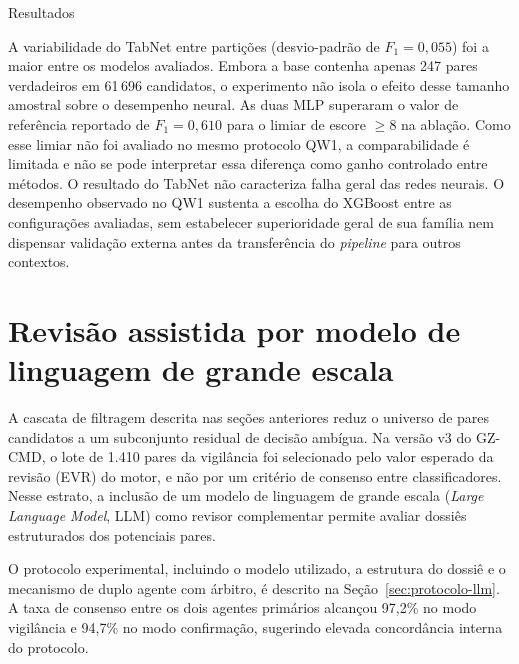 \begin{chapter}{Resultados}


A variabilidade do TabNet entre partições (desvio-padrão de $F_1 = 0{,}055$) foi a maior entre os modelos avaliados. Embora a base contenha apenas 247 pares verdadeiros em 61\,696 candidatos, o experimento não isola o efeito desse tamanho amostral sobre o desempenho neural.
As duas MLP superaram o valor de referência reportado de $F_1 = 0{,}610$ para o limiar de escore $\geq 8$ na ablação. Como esse limiar não foi avaliado no mesmo protocolo QW1, a comparabilidade é limitada e não se pode interpretar essa diferença como ganho controlado entre métodos. O resultado do TabNet não caracteriza falha geral das redes neurais.
O desempenho observado no QW1 sustenta a escolha do XGBoost entre as configurações avaliadas, sem estabelecer superioridade geral de sua família nem dispensar validação externa antes da transferência do \textit{pipeline} para outros contextos.

\section{Revisão assistida por modelo de linguagem de grande escala}
\label{sec:cap5-qw2-llm}

A cascata de filtragem descrita nas seções anteriores reduz o universo de pares candidatos a um subconjunto residual de decisão ambígua. Na versão v3 do GZ-CMD, o lote de 1.410 pares da vigilância foi selecionado pelo valor esperado da revisão (EVR) do motor, e não por um critério de consenso entre classificadores.
Nesse estrato, a inclusão de um modelo de linguagem de grande escala (\textit{Large Language Model}, LLM) como revisor complementar permite avaliar dossiês estruturados dos potenciais pares.

O protocolo experimental, incluindo o modelo utilizado, a estrutura do dossiê e o mecanismo de duplo agente com árbitro, é descrito na Seção~\ref{sec:protocolo-llm}.
A taxa de consenso entre os dois agentes primários alcançou 97{,}2\% no modo vigilância e 94{,}7\% no modo confirmação, sugerindo elevada concordância interna do protocolo.




\end{chapter}
